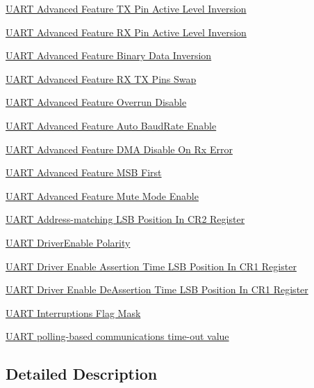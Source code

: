 \begin{DoxyCompactItemize}
\hyperlink{group___u_a_r_t___tx___inv}{U\+A\+R\+T Advanced Feature T\+X Pin Active Level Inversion}
\item 
\hyperlink{group___u_a_r_t___rx___inv}{U\+A\+R\+T Advanced Feature R\+X Pin Active Level Inversion}
\item 
\hyperlink{group___u_a_r_t___data___inv}{U\+A\+R\+T Advanced Feature Binary Data Inversion}
\item 
\hyperlink{group___u_a_r_t___rx___tx___swap}{U\+A\+R\+T Advanced Feature R\+X T\+X Pins Swap}
\item 
\hyperlink{group___u_a_r_t___overrun___disable}{U\+A\+R\+T Advanced Feature Overrun Disable}
\item 
\hyperlink{group___u_a_r_t___auto_baud_rate___enable}{U\+A\+R\+T Advanced Feature Auto Baud\+Rate Enable}
\item 
\hyperlink{group___u_a_r_t___d_m_a___disable__on___rx___error}{U\+A\+R\+T Advanced Feature D\+M\+A Disable On Rx Error}
\item 
\hyperlink{group___u_a_r_t___m_s_b___first}{U\+A\+R\+T Advanced Feature M\+S\+B First}
\item 
\hyperlink{group___u_a_r_t___mute___mode}{U\+A\+R\+T Advanced Feature Mute Mode Enable}
\item 
\hyperlink{group___u_a_r_t___c_r2___a_d_d_r_e_s_s___l_s_b___p_o_s}{U\+A\+R\+T Address-\/matching L\+S\+B Position In C\+R2 Register}
\item 
\hyperlink{group___u_a_r_t___driver_enable___polarity}{U\+A\+R\+T Driver\+Enable Polarity}
\item 
\hyperlink{group___u_a_r_t___c_r1___d_e_a_t___a_d_d_r_e_s_s___l_s_b___p_o_s}{U\+A\+R\+T Driver Enable Assertion Time L\+S\+B Position In C\+R1 Register}
\item 
\hyperlink{group___u_a_r_t___c_r1___d_e_d_t___a_d_d_r_e_s_s___l_s_b___p_o_s}{U\+A\+R\+T Driver Enable De\+Assertion Time L\+S\+B Position In C\+R1 Register}
\item 
\hyperlink{group___u_a_r_t___interruption___mask}{U\+A\+R\+T Interruptions Flag Mask}
\item 
\hyperlink{group___u_a_r_t___time_out___value}{U\+A\+R\+T polling-\/based communications time-\/out value}
\end{DoxyCompactItemize}


\subsection{Detailed Description}
